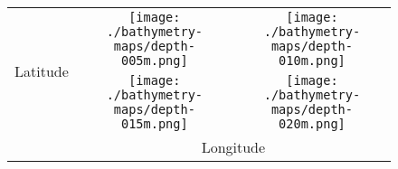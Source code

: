 \documentclass[border=20pt,varwidth=30cm]{standalone}
\begin{document}
\begin{figure}
    \centering
    \begin{tabular}{@{}ccc@{}}
        \multirow{2}{*}[16em]{\begin{rotate}{90}\Huge Latitude\end{rotate}} &
        \texttt{[image: ./bathymetry-maps/depth-005m.png]} &
        \texttt{[image: ./bathymetry-maps/depth-010m.png]} \\
        &
        \texttt{[image: ./bathymetry-maps/depth-015m.png]} &
        \texttt{[image: ./bathymetry-maps/depth-020m.png]} \\
        & \multicolumn{2}{c}{\Huge Longitude}
    \end{tabular}
\end{figure}
\end{document}
